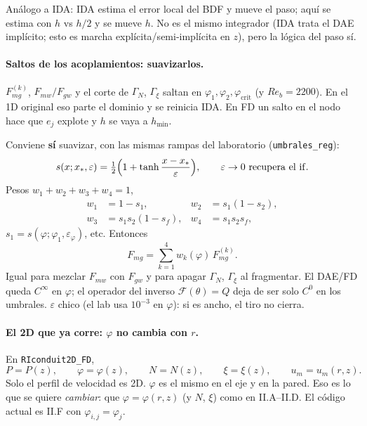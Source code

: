 \documentclass[11pt,a4paper]{article}
\newcommand{\F}{\mathcal{F}}
\begin{document}
Análogo a IDA: IDA estima el error local del BDF y mueve
el paso; aquí se estima con $h$ vs $h/2$ y se mueve $h$.
No es el mismo integrador (IDA trata el DAE implícito;
esto es marcha explícita/semi-implícita en $z$), pero la
lógica del paso sí.

\paragraph{Saltos de los acoplamientos: suavizarlos.}
$F_{mg}^{(k)}$, $F_{mw}/F_{gw}$ y el corte de $\Gamma_N$,
$\Gamma_\xi$ saltan en $\varphi_1,\varphi_2,\varphi_{\mathrm{crit}}$
(y $Re_b=2200$). En el 1D original eso parte el dominio y
se reinicia IDA. En FD un salto en el nodo hace que $e_j$
explote y $h$ se vaya a $h_{\min}$.

Conviene \textbf{sí} suavizar, con las mismas rampas del
laboratorio (\texttt{umbrales\_reg}):
\begin{equation}
\label{eq:s-tanh}
s(x;x_\ast,\varepsilon)
=\tfrac12\Bigl(1+\tanh\frac{x-x_\ast}{\varepsilon}\Bigr),
\qquad
\varepsilon\to0
\text{ recupera el }\mathrm{if}.
\end{equation}
Pesos $w_1+w_2+w_3+w_4=1$,
\begin{equation}
\label{eq:wk}
\begin{aligned}
w_1&=1-s_1,&
w_2&=s_1(1-s_2),\\
w_3&=s_1 s_2(1-s_f),&
w_4&=s_1 s_2 s_f,
\end{aligned}
\end{equation}
$s_1=s(\varphi;\varphi_1,\varepsilon_\varphi)$, etc. Entonces
\begin{equation}
\label{eq:Fmg-suave}
F_{mg}
=\sum_{k=1}^4 w_k(\varphi)\,F_{mg}^{(k)}.
\end{equation}
Igual para mezclar $F_{mw}$ con $F_{gw}$ y para apagar
$\Gamma_N$, $\Gamma_\xi$ al fragmentar. El DAE/FD queda
$C^\infty$ en $\varphi$; el operador del inverso
$\F(\theta)=Q$ deja de ser solo $C^0$ en los umbrales.
$\varepsilon$ chico (el lab usa $10^{-3}$ en $\varphi$):
si es ancho, el tiro no cierra.

\paragraph{El 2D que ya corre: $\varphi$ \textbf{no} cambia con $r$.}
En \texttt{RIconduit2D\_FD},
\[
P=P(z),\qquad
\varphi=\varphi(z),\qquad
N=N(z),\qquad
\xi=\xi(z),\qquad
u_m=u_m(r,z).
\]
Solo el perfil de velocidad es 2D. $\varphi$ es el mismo
en el eje y en la pared. Eso es lo que se quiere
\emph{cambiar}: que $\varphi=\varphi(r,z)$ (y $N$, $\xi$)
como en II.A--II.D. El código actual es II.F con
$\varphi_{i,j}=\varphi_j$.
\end{document}
